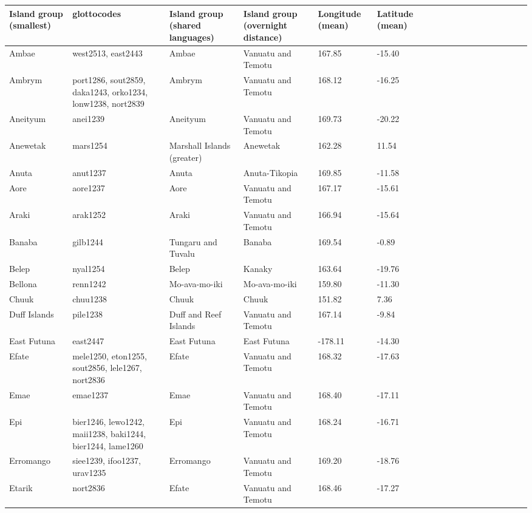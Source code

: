 \documentclass[a4paper,10pt]{article} %
\begin{document}
\begin{landscape}
\begin{longtable}{| p{2.5cm} |  p{7cm} | p{2.5cm}  | p{2.5cm}  | p{2.5cm}  | p{2.5cm}  | p{2.5cm}  | p{2cm}  | p{1cm} | p{1cm}  | p{1cm} | p{1cm}  | p{1.5cm}  | p{1cm} | p{1cm}  | p{1cm}  |p{1cm}  | p{1cm}    |}
\hline
\textbf{Island group (smallest)}& \textbf{glottocodes}& \textbf{Island group (shared languages)}& \textbf{Island group (overnight distance)}& \textbf{Longitude (mean)}& \textbf{Latitude (mean)} \\ \hline
\endhead
\hline
 Ambae & west2513, east2443 & Ambae & Vanuatu and Temotu & 167.85 & -15.40 \\ \hline
 Ambrym & port1286, sout2859, daka1243, orko1234, lonw1238, nort2839 & Ambrym & Vanuatu and Temotu & 168.12 & -16.25 \\ \hline
 Aneityum & anei1239 & Aneityum & Vanuatu and Temotu & 169.73 & -20.22 \\ \hline
 Anewetak & mars1254 & Marshall Islands (greater) & Anewetak & 162.28 & 11.54 \\ \hline
 Anuta & anut1237 & Anuta & Anuta-Tikopia & 169.85 & -11.58 \\ \hline
 Aore & aore1237 & Aore & Vanuatu and Temotu & 167.17 & -15.61 \\ \hline
 Araki & arak1252 & Araki & Vanuatu and Temotu & 166.94 & -15.64 \\ \hline
 Banaba & gilb1244 & Tungaru and Tuvalu & Banaba & 169.54 & -0.89 \\ \hline
 Belep & nyal1254 & Belep & Kanaky & 163.64 & -19.76 \\ \hline
 Bellona & renn1242 & Mo-ava-mo-iki & Mo-ava-mo-iki & 159.80 & -11.30 \\ \hline
 Chuuk & chuu1238 & Chuuk & Chuuk & 151.82 & 7.36 \\ \hline
 Duff Islands & pile1238 & Duff and Reef Islands & Vanuatu and Temotu & 167.14 & -9.84 \\ \hline
 East Futuna & east2447 & East Futuna & East Futuna & -178.11 & -14.30 \\ \hline
 Efate & mele1250, eton1255, sout2856, lele1267, nort2836 & Efate & Vanuatu and Temotu & 168.32 & -17.63 \\ \hline
 Emae & emae1237 & Emae & Vanuatu and Temotu & 168.40 & -17.11 \\ \hline
 Epi & bier1246, lewo1242, maii1238, baki1244, bier1244, lame1260 & Epi & Vanuatu and Temotu & 168.24 & -16.71 \\ \hline
 Erromango & siee1239, ifoo1237, urav1235 & Erromango & Vanuatu and Temotu & 169.20 & -18.76 \\ \hline
 Etarik & nort2836 & Efate & Vanuatu and Temotu & 168.46 & -17.27 \\ \hline

\end{longtable}
\end{landscape}
\end{document}

